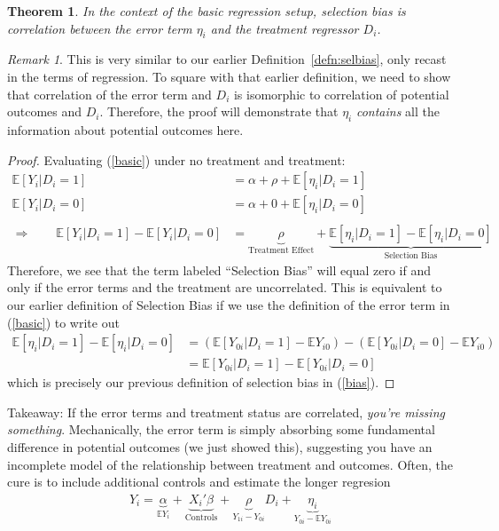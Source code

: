 \documentclass[12pt]{article}
\theoremstyle{plain}
\newtheorem{thm}{Theorem}[section]
\theoremstyle{definition}
\theoremstyle{remark}
\newtheorem*{rmk}{Remark}
\begin{document}
\begin{thm}
In the context of the basic regression setup, selection bias is
correlation between the error term $\eta_i$ and the treatment
regressor $D_i$.
\end{thm}
\begin{rmk}
This is very similar to our earlier Definition~\ref{defn:selbias}, only
recast in the terms of regression. To square with that earlier
definition, we need to show that correlation of the error term and $D_i$
is isomorphic to correlation of potential outcomes and $D_i$. Therefore,
the proof will demonstrate that $\eta_i$ \emph{contains} all the
information about potential outcomes here.
\end{rmk}
\begin{proof}
Evaluating (\ref{basic}) under no treatment and treatment:
\begin{align*}
  \mathbb{E}[Y_i | D_i = 1]
    &= \alpha + \rho + \mathbb{E}[\eta_i | D_i = 1]\\
  \mathbb{E}[Y_i | D_i = 0]
    &= \alpha + 0 + \mathbb{E}[\eta_i | D_i = 0] \\\\
  \Rightarrow\qquad
  \mathbb{E}[Y_i | D_i = 1] - \mathbb{E}[Y_i | D_i = 0]
    &= \underbrace{\rho}_{\text{Treatment Effect}} +
    \underbrace{\mathbb{E}[\eta_i | D_i = 1]
      -\mathbb{E}[\eta_i | D_i = 0]}_{\text{Selection Bias}}
\end{align*}
Therefore, we see that the term labeled ``Selection Bias'' will equal
zero if and only if the error terms and the treatment are uncorrelated.
This is equivalent to our earlier definition of Selection Bias if we use
the definition of the error term in (\ref{basic}) to write out
\begin{align*}
  \mathbb{E}[\eta_i | D_i = 1] -\mathbb{E}[\eta_i | D_i = 0]
  &=
  \left(\mathbb{E}[Y_{0i} | D_i = 1] - \mathbb{E}Y_{i0}\right)
  -\left(\mathbb{E}[Y_{0i} | D_i = 0] - \mathbb{E}Y_{i0} \right)\\
  &=
  \mathbb{E}[Y_{0i} | D_i = 1] -\mathbb{E}[Y_{0i} | D_i = 0]
\end{align*}
which is precisely our previous definition of selection bias in
(\ref{bias}).
\end{proof}

Takeaway: If the error terms and treatment status are correlated,
\emph{you're missing something}. Mechanically, the error term is simply
absorbing some fundamental difference in potential outcomes (we just
showed this), suggesting you have an incomplete model of the
relationship between treatment and outcomes. Often, the cure is to include additional controls and estimate the longer regresion
\begin{align}
  Y_i =
  \underbrace{\alpha}_{\mathbb{E}Y_i}
  + \underbrace{X_i' \beta}_{\text{Controls}}
  + \underbrace{\rho}_{Y_{1i} - Y_{0i}} D_i
  + \underbrace{\eta_i}_{Y_{0i}-\mathbb{E}Y_{0i}}
  \label{longreg}
\end{align}
\end{document}
